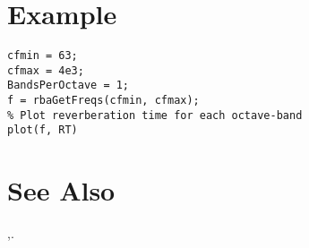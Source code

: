 
\section{Example} %
\label{sec:rbaGetFreqs_example}
\begin{lstlisting}
cfmin = 63;
cfmax = 4e3;
BandsPerOctave = 1;
f = rbaGetFreqs(cfmin, cfmax);
% Plot reverberation time for each octave-band
plot(f, RT)
\end{lstlisting}

\section{See Also} %
\label{sec:rbaGetFreqs_see_also}
\texttt{},\quad \texttt{}.




